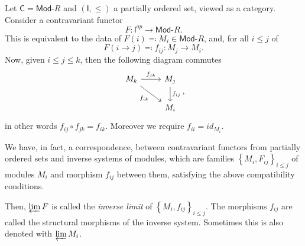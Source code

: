 \begin{ex}
	Let $\mathsf{C} = \mathsf{Mod}\text{-}R$ and $\left( \mathsf{I}, \leq \right)$ a partially ordered set, viewed as a category.
	Consider a contravariant functor
	\begin{equation}
	F\colon \mathsf{I}^{op} \to \mathsf{Mod}\text{-}R
	.\end{equation} 
	This is equivalent to the data of $F(i) \eqqcolon M_i \in \mathsf{Mod}\text{-}R$, and, for all $i \leq j$ of
	\begin{equation}
		F(i \to j) \eqqcolon f_{ij}\colon M_j \to M_i
	.\end{equation} 
	Now, given $i \leq j \leq k$, then the following diagram commutes
	\begin{equation}
	\begin{tikzcd}
		M_k \arrow[r, "f_{jk}", rightarrow] \arrow[rd, "f_{ik}"', rightarrow] &
		M_j \arrow[d, "f_{ij}", rightarrow] \\
		& M_i
	\end{tikzcd}
	,\end{equation} 
	in other words $f_{ij} \circ f_{jk} = f_{ik}$.
	Moreover we require $f_{ii} = id_{M_i}$.

	We have, in fact, a correspondence, between contravariant functors from partially ordered sets and
	inverse systems of modules, which are families $\left\{ M_i, F_{ij} \right\}_{i \leq j}$ of modules $M_i$ and morphism $f_{ij}$ between them, satisfying the above compatibility conditions.

	Then, $\varprojlim F$ is called the {\em inverse limit} of $\left\{ M_i, f_{ij} \right\}_{i \leq j}$.
	The morphisms $f_{ij}$ are called the structural morphisms of the inverse system.
	Sometimes this is also denoted with $\varprojlim M_i$.
	

\end{ex}
